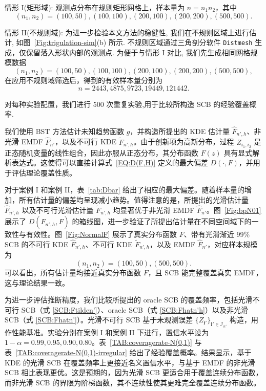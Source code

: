 \documentclass[a4paper,openay,14pt]{ctexbook}
\numberwithin{equation}{section}
\numberwithin{lem}{section}
\begin{document}
情形 I(矩形域): 观测点分布在规则矩形网格上，样本量为 \( n = n_1 n_2 \)，其中  
\[
(n_1, n_2) = (100, 50), (100, 100), (200, 100), (200, 200), (500, 500).
\]

情形 II(不规则域): 为进一步检验本文方法的稳健性, 我们在不规则区域上进行估计, 如图~\ref{Fig:trigulation-sim}(b) 所示. 不规则区域通过三角剖分软件 \texttt{Distmesh} 生成，仅保留落入形状内部的观测点. 为便于与情形 I 对比, 我们先生成相同网格规模数据  
\[
(n_1, n_2) = (100, 50), (100, 100), (200, 100), (200, 200), (500, 500),
\]
在应用不规则域筛选后，得到的有效样本量分别为  
\[
n = 2443, 4875, 9723, 19449, 121442.
\]

对每种实验配置，我们进行 500 次重复实验,用于比较所构造 SCB 的经验覆盖概率.

我们使用 BST 方法估计未知趋势函数 \( g \)，并构造所提出的 KDE 估计量 \( \hat{F}_{n',h} \)、非光滑 EMDF \( \hat{F}_{n'} \)，以及不可行 KDE \( \tilde{F}_{n',h} \)。由于创新项为高斯分布，过程 \( Z_{i_1,i_2} \) 是正态随机变量的线性组合，因此亦服从正态分布，其分布函数 \( F(z) \) 具有显式解析表达式。这使得可以直接计算式~\eqref{EQ:D(F,H)} 定义的最大偏差 \( D(\cdot, F) \)，并用于评估理论覆盖性质。

对于案例 I 和案例 II，表~\ref{tab:Dbar} 给出了相应的最大偏差。随着样本量的增加，所有估计量的偏差均呈现减小趋势。值得注意的是，所提出的光滑估计量 \( \hat{F}_{n',h} \) 以及不可行光滑估计量 \( \tilde{F}_{n',h} \) 均显著优于非光滑 EMDF \( \hat{F}_{n'} \)。图~\ref{Fig:bpN01} 展示了 \( D(\hat{F}_{n',h}, F) \) 的箱线图，进一步验证了所提出估计量在不同空间域下的一致性与有效性。图~\ref{Fig:NormalF} 展示了真实分布函数 \( F \)、带有光滑渐近 99\% SCB 的不可行 KDE \( \hat{F}_{n',h} \)、不可行 KDE \( \tilde{F}_{n',h} \)，以及 EMDF $\hat{F}_{n'}$，对应样本规模为  
\[
(n_1, n_2) = (100, 50), (500, 500).
\]
可以看出，所有估计量均接近真实分布函数 \( F \)，且 SCB 能完整覆盖真实 EMDF，这与理论结果一致。

为进一步评估推断精度，我们比较所提出的 oracle SCB 的覆盖频率，包括光滑不可行 SCB（式 \eqref{SCB:Ftilden'}）、oracle SCB（式 \eqref{SCB:Fhatn'h}）以及非光滑 SCB（式 \eqref{SCB:Fhatn'}）。光滑不可行 SCB 基于未观测误差 \(\{Z_{\mathbf{i}'}\}_{\mathbf{i}'\in\mathcal{I}_{n'}}\) 构造，用作性能基准。实验分别在案例 I 和案例 II 下进行，置信水平设为 \(1-\alpha = 0.99, 0.95, 0.90, 0.80\)。表~\ref{TAB:coveragerate-N(0,1)} 与表~\ref{TAB:coveragerate-N(0,1)-irregular} 给出了经验覆盖概率。结果显示，基于 KDE 的光滑 SCB 在覆盖频率上更接近名义置信水平，与基于 EMDF 的非光滑 SCB 相比表现更优。这是预期的，因为光滑 SCB 更适合用于覆盖连续分布函数，而非光滑 SCB 的界限为阶梯函数，其不连续性使其更难完全覆盖连续分布函数。
\end{document}
